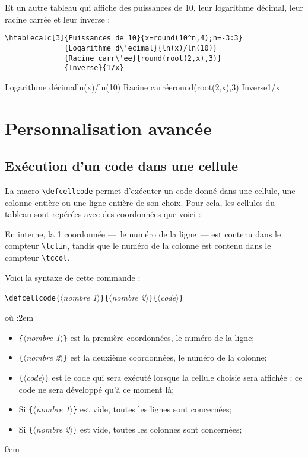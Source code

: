 \documentclass[a4paper,10pt]{article}
\newcommand\argu[1]{$\langle$\textit{#1}$\rangle$}
\newcommand\ARGU[1]{\texttt{\{}\argu{#1}\texttt{\}}}
\newcommand\verbinline{\lstinline[breaklines=false,basicstyle=\normalsize\ttfamily]}
\newcommand\mywidth{0.85\linewidth}
\begin{document}
Et un autre tableau qui affiche des puissances de 10, leur logarithme décimal, leur racine carrée et leur inverse :
\begin{center}
\begin{minipage}{\mywidth}
\begin{lstlisting}
\htablecalc[3]{Puissances de 10}{x=round(10^n,4);n=-3:3}
              {Logarithme d\'ecimal}{ln(x)/ln(10)}
              {Racine carr\'ee}{round(root(2,x),3)}
              {Inverse}{1/x}
\end{lstlisting}
\end{minipage}

              {Logarithme d\'ecimal}{ln(x)/ln(10)}
              {Racine carr\'ee}{round(root(2,x),3)}
              {Inverse}{1/x}
\end{center}

\section{Personnalisation avancée}
\subsection{Exécution d'un code dans une cellule}
La macro \verbinline|\defcellcode| permet d'exécuter un code donné dans une cellule, une colonne entière ou une ligne entière de son choix. Pour cela, les cellules du tableau sont repérées avec des coordonnées que voici :\smallskip

\begin{center}
	\def\tcprintvalue#1{}\def\tcprintresult#1#2{}
	\edefcellcode{}{}{(\number\tclin,\number\tccol)}
\end{center}
\medskip

En interne, la 1\iere{} coordonnée ---~le numéro de la ligne~--- est contenu dans le compteur \verbinline{\tclin}, tandis que le numéro de la colonne est contenu dans le compteur \verbinline{\tccol}.\smallskip

Voici la syntaxe de cette commande :

\verbinline|\defcellcode|\ARGU{nombre 1}\ARGU{nombre 2}\ARGU{code}
\smallskip

où :\parindent2em
\begin{itemize}
	\item \ARGU{nombre 1} est la première coordonnées, le numéro de la ligne;
	\item \ARGU{nombre 2} est la deuxième coordonnées, le numéro de la colonne;
	\item \ARGU{code} est le code qui sera exécuté lorsque la cellule choisie sera affichée : ce code ne sera développé qu'à ce moment là;
	\item Si \ARGU{nombre 1} est vide, toutes les lignes sont concernées;
	\item Si \ARGU{nombre 2} est vide, toutes les colonnes sont concernées;
\end{itemize}\parindent0em
\smallskip
\end{document}
